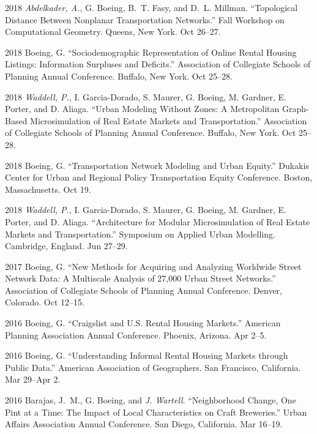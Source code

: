 \documentclass[12pt,letterpaper]{report}
\begin{document}
\begin{tablist}
		\item[2018] \tab \textit{Abdelkader, A.}, G. Boeing, B.~T. Fasy, and D.~L. Millman. \enquote{Topological Distance Between Nonplanar Transportation Networks.} Fall Workshop on Computational Geometry. Queens, New York. Oct 26--27.

		\item[2018] \tab Boeing, G. \enquote{Sociodemographic Representation of Online Rental Housing Listings: Information Surpluses and Deficits.} Association of Collegiate Schools of Planning Annual Conference. Buffalo, New York. Oct 25--28.

		\item[2018] \tab \textit{Waddell, P.}, I. Garcia-Dorado, S. Maurer, G. Boeing, M. Gardner, E. Porter, and D. Aliaga. \enquote{Urban Modeling Without Zones: A Metropolitan Graph-Based Microsimulation of Real Estate Markets and Transportation.} Association of Collegiate Schools of Planning Annual Conference. Buffalo, New York. Oct 25--28.

		\item[2018] \tab Boeing, G. \enquote{Transportation Network Modeling and Urban Equity.} Dukakis Center for Urban and Regional Policy Transportation Equity Conference. Boston, Massachusetts. Oct 19.

		\item[2018] \tab \textit{Waddell, P.}, I. Garcia-Dorado, S. Maurer, G. Boeing, M. Gardner, E. Porter, and D. Aliaga. \enquote{Architecture for Modular Microsimulation of Real Estate Markets and Transportation.} Symposium on Applied Urban Modelling. Cambridge, England. Jun 27--29.

		\item[2017] \tab Boeing, G. \enquote{New Methods for Acquiring and Analyzing Worldwide Street Network Data: A Multiscale Analysis of 27,000 Urban Street Networks.} Association of Collegiate Schools of Planning Annual Conference. Denver, Colorado. Oct 12--15.

		\item[2016] \tab Boeing, G. \enquote{Craigslist and U.S. Rental Housing Markets.} American Planning Association Annual Conference. Phoenix, Arizona. Apr 2--5.

		\item[2016] \tab Boeing, G. \enquote{Understanding Informal Rental Housing Markets through Public Data.} American Association of Geographers. San Francisco, California. Mar 29--Apr 2.

		\item[2016] \tab Barajas, J.~M., G. Boeing, and \textit{J. Wartell}. \enquote{Neighborhood Change, One Pint at a Time: The Impact of Local Characteristics on Craft Breweries.} Urban Affairs Association Annual Conference. San Diego, California. Mar 16--19.


\end{tablist}
\end{document}
